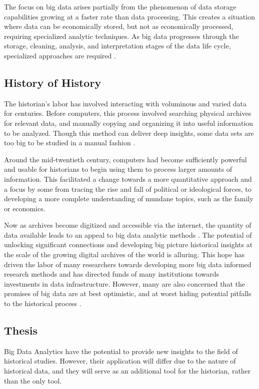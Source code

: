 \documentclass[sigconf]{acmart}
\begin{document}
The focus on big data arises partially from the phenomenon of data storage capabilities growing at a faster rate than data processing. This creates a situation where data can be economically stored, but not as economically processed, requiring specialized analytic techniques. As big data progresses through the storage, cleaning, analysis, and interpretation stages of the data life cycle, specialized approaches are required \cite{bdsurvey}.

\subsection{History of History}

The historian's labor has involved interacting with voluminous and varied data for centuries. Before computers, this process involved searching physical archives for relevant data, and manually copying and organizing it into useful information to be analyzed. Though this method can deliver deep insights, some data sets are too big to be studied in a manual fashion \cite{bdglobalhist}.

Around the mid-twentieth century, computers had become sufficiently powerful and usable  for historians to begin using them to process larger amounts of information. This facilitated a change towards a more quantitative approach and a focus by some from tracing the rise and fall of political or ideological forces, to developing a more complete understanding of mundane topics, such as the family or economics.

Now as archives become digitized and accessible via the internet, the quantity of data available leads to an appeal to big data analytic methods \cite{digitalrepublicletters}. The potential of unlocking significant connections and developing big picture historical insights at the scale of the growing digital archives of the world is alluring. This hope has driven the labor of many researchers towards developing more big data informed research methods and has directed funds of many institutions towards investments in data infrastructure. However, many are also concerned that the promises of big data are at best optimistic, and at worst hiding potential pitfalls to the historical process \cite{bdglobalhist}.

\subsection{Thesis}

Big Data Analytics have the potential to provide new insights to the field of historical studies. However, their application will differ due to the nature of historical data, and they will serve as an additional tool for the historian, rather than the only tool.
\end{document}
